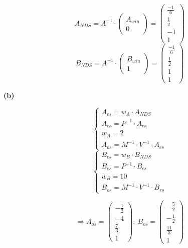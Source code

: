 \documentclass[fleqn]{article}
\begin{document}
$$A_{NDS} = A^{-1} \cdot  \begin{pmatrix} A_{win}\\0 \end{pmatrix} =\begin{pmatrix} \frac{-1}{6} \\ \frac{1}{2} \\ -1 \\1 \end{pmatrix}  $$
$$B_{NDS} = A^{-1} \cdot  \begin{pmatrix} B_{win}\\1 \end{pmatrix} =\begin{pmatrix} \frac{-1}{6} \\ \frac{1}{2} \\ 1 \\1 \end{pmatrix}  $$

\indent\indent\textbf{(b)}
\begin{center}
\begin{equation}
    \left\{
        \begin{array}{lr}    
            A_{cs} = w_A\cdot A_{NDS} \\
            A_{es} = P^{-1}\cdot A_{cs} \\
            w_A = 2 \\
            A_{os} = M^{-1} \cdot V^{-1} \cdot A_{es}
        \end{array}
    \right.
\end{equation}
\begin{equation}
    \left\{
        \begin{array}{lr}    
            B_{cs} = w_B\cdot B_{NDS} \\
            B_{es} = P^{-1}\cdot B_{cs} \\
            w_B = 10\\
            B_{os} = M^{-1} \cdot V^{-1} \cdot B_{es}
        \end{array}
    \right.
\end{equation}
\end{center}

$$\Rightarrow A_{os} = \begin{pmatrix} -\frac{1}{2} \\ -4 \\ \frac{7}{3} \\ 1 \end{pmatrix}
,\ B_{os} = \begin{pmatrix} -\frac{5}{2}\\ -\frac{1}{2} \\ \frac{11}{3} \\ 1 \end{pmatrix}$$
\end{document}

